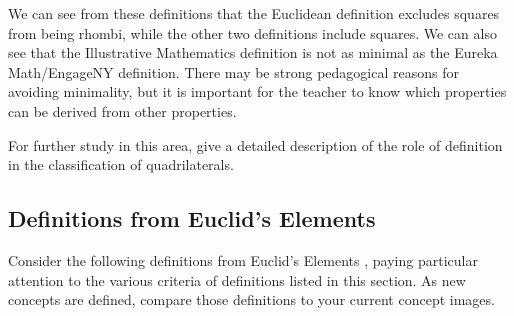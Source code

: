 \documentclass[
]{book}
\theoremstyle{definition}
\theoremstyle{definition}
\theoremstyle{definition}
\theoremstyle{definition}
\theoremstyle{remark}
\begin{document}
We can see from these definitions that the Euclidean definition excludes squares from being rhombi, while the other two definitions include squares. We can also see that the Illustrative Mathematics definition is not as minimal as the Eureka Math/EngageNY definition. There may be strong pedagogical reasons for avoiding minimality, but it is important for the teacher to know which properties can be derived from other properties.

For further study in this area, \citet{usiskin2008} give a detailed description of the role of definition in the classification of quadrilaterals.

\hypertarget{definitions-from-euclids-elements}{%
\subsection{Definitions from Euclid's Elements}\label{definitions-from-euclids-elements}}

Consider the following definitions from Euclid's Elements \citep[p.~153-154]{Heath1908_1}, paying particular attention to the various criteria of definitions listed in this section. As new concepts are defined, compare those definitions to your current concept images.
\end{document}

